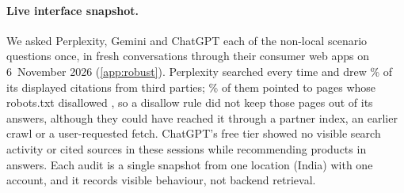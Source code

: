 \paragraph{Live interface snapshot.} We asked Perplexity, Gemini and ChatGPT each of the \AudNQW{} non-local scenario
questions once, in fresh conversations through their consumer web apps on 6~November 2026 (\cref{app:robust}).
Perplexity searched every time and drew \AudPThirdPct\% of its \AudPCites{} displayed citations from third parties;
\AudPBlockedPct\% of them pointed to pages whose robots.txt disallowed , so a disallow rule did not
keep those pages out of its answers, although they could have reached it through a partner index, an earlier crawl or a
user-requested fetch. ChatGPT's free tier showed no visible search activity or cited sources in these sessions while
recommending products in \AudCTop{} answers. Each audit is a single snapshot from one location (India) with one account,
and it records visible behaviour, not backend retrieval.
